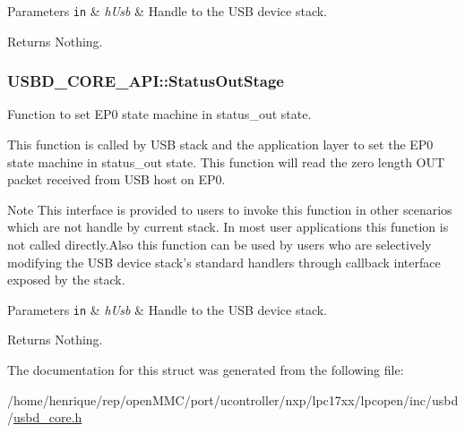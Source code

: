 \begin{DoxyParams}[1]{Parameters}
\mbox{\tt in}  & {\em h\-Usb} & Handle to the U\-S\-B device stack. \\
\hline
\end{DoxyParams}
\begin{DoxyReturn}{Returns}
Nothing. 
\end{DoxyReturn}
\hypertarget{structUSBD__CORE__API_aefbfebfc97c53ff2d5030fdd44dbec7e}{
\subsubsection[{Status\-Out\-Stage}]{ U\-S\-B\-D\-\_\-\-C\-O\-R\-E\-\_\-\-A\-P\-I\-::\-Status\-Out\-Stage}}\label{structUSBD__CORE__API_aefbfebfc97c53ff2d5030fdd44dbec7e}
Function to set E\-P0 state machine in status\-\_\-out state.

This function is called by U\-S\-B stack and the application layer to set the E\-P0 state machine in status\-\_\-out state. This function will read the zero length O\-U\-T packet received from U\-S\-B host on E\-P0. \par
\begin{DoxyNote}{Note}
This interface is provided to users to invoke this function in other scenarios which are not handle by current stack. In most user applications this function is not called directly.\-Also this function can be used by users who are selectively modifying the U\-S\-B device stack's standard handlers through callback interface exposed by the stack.
\end{DoxyNote}

\begin{DoxyParams}[1]{Parameters}
\mbox{\tt in}  & {\em h\-Usb} & Handle to the U\-S\-B device stack. \\
\hline
\end{DoxyParams}
\begin{DoxyReturn}{Returns}
Nothing. 
\end{DoxyReturn}


The documentation for this struct was generated from the following file\-:\begin{DoxyCompactItemize}
\item 
/home/henrique/rep/open\-M\-M\-C/port/ucontroller/nxp/lpc17xx/lpcopen/inc/usbd/\hyperlink{usbd__core_8h}{usbd\-\_\-core.\-h}\end{DoxyCompactItemize}
